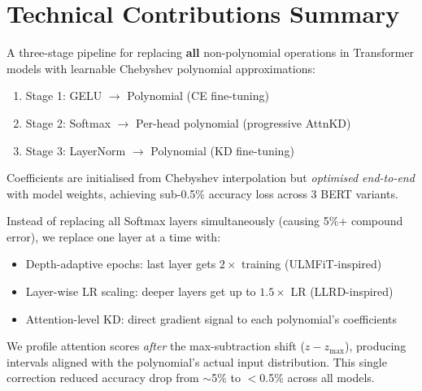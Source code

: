 \documentclass[12pt, a4paper]{article}
\begin{document}
\section{Technical Contributions Summary}

\begin{contribution}
A three-stage pipeline for replacing \textbf{all} non-polynomial operations in Transformer models with learnable Chebyshev polynomial approximations:
\begin{enumerate}[leftmargin=1.5em]
  \item Stage 1: GELU $\to$ Polynomial (CE fine-tuning)
  \item Stage 2: Softmax $\to$ Per-head polynomial (progressive AttnKD)
  \item Stage 3: LayerNorm $\to$ Polynomial (KD fine-tuning)
\end{enumerate}
Coefficients are initialised from Chebyshev interpolation but \emph{optimised end-to-end} with model weights, achieving sub-0.5\% accuracy loss across 3 BERT variants.
\end{contribution}

\begin{contribution}
Instead of replacing all Softmax layers simultaneously (causing 5\%+ compound error), we replace one layer at a time with:
\begin{itemize}[leftmargin=1.5em]
  \item Depth-adaptive epochs: last layer gets $2\times$ training (ULMFiT-inspired)
  \item Layer-wise LR scaling: deeper layers get up to $1.5\times$ LR (LLRD-inspired)
  \item Attention-level KD: direct gradient signal to each polynomial's coefficients
\end{itemize}
\end{contribution}

\begin{contribution}
We profile attention scores \emph{after} the max-subtraction shift ($z - z_{\max}$), producing intervals aligned with the polynomial's actual input distribution. This single correction reduced accuracy drop from $\sim$5\% to $<$0.5\% across all models.
\end{contribution}
\end{document}
